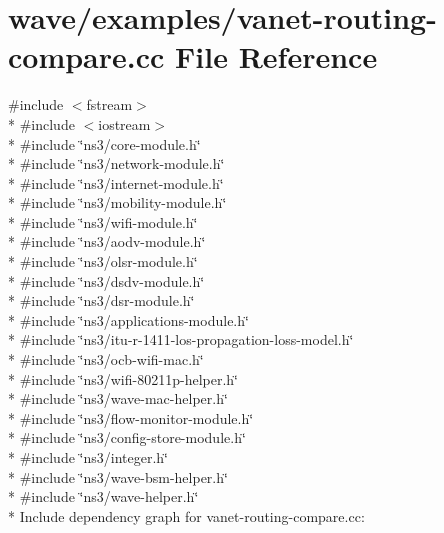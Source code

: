 \hypertarget{vanet-routing-compare_8cc}{}\section{wave/examples/vanet-\/routing-\/compare.cc File Reference}
\label{vanet-routing-compare_8cc}
{\ttfamily \#include $<$fstream$>$}\\*
{\ttfamily \#include $<$iostream$>$}\\*
{\ttfamily \#include \char`\"{}ns3/core-\/module.\+h\char`\"{}}\\*
{\ttfamily \#include \char`\"{}ns3/network-\/module.\+h\char`\"{}}\\*
{\ttfamily \#include \char`\"{}ns3/internet-\/module.\+h\char`\"{}}\\*
{\ttfamily \#include \char`\"{}ns3/mobility-\/module.\+h\char`\"{}}\\*
{\ttfamily \#include \char`\"{}ns3/wifi-\/module.\+h\char`\"{}}\\*
{\ttfamily \#include \char`\"{}ns3/aodv-\/module.\+h\char`\"{}}\\*
{\ttfamily \#include \char`\"{}ns3/olsr-\/module.\+h\char`\"{}}\\*
{\ttfamily \#include \char`\"{}ns3/dsdv-\/module.\+h\char`\"{}}\\*
{\ttfamily \#include \char`\"{}ns3/dsr-\/module.\+h\char`\"{}}\\*
{\ttfamily \#include \char`\"{}ns3/applications-\/module.\+h\char`\"{}}\\*
{\ttfamily \#include \char`\"{}ns3/itu-\/r-\/1411-\/los-\/propagation-\/loss-\/model.\+h\char`\"{}}\\*
{\ttfamily \#include \char`\"{}ns3/ocb-\/wifi-\/mac.\+h\char`\"{}}\\*
{\ttfamily \#include \char`\"{}ns3/wifi-\/80211p-\/helper.\+h\char`\"{}}\\*
{\ttfamily \#include \char`\"{}ns3/wave-\/mac-\/helper.\+h\char`\"{}}\\*
{\ttfamily \#include \char`\"{}ns3/flow-\/monitor-\/module.\+h\char`\"{}}\\*
{\ttfamily \#include \char`\"{}ns3/config-\/store-\/module.\+h\char`\"{}}\\*
{\ttfamily \#include \char`\"{}ns3/integer.\+h\char`\"{}}\\*
{\ttfamily \#include \char`\"{}ns3/wave-\/bsm-\/helper.\+h\char`\"{}}\\*
{\ttfamily \#include \char`\"{}ns3/wave-\/helper.\+h\char`\"{}}\\*
Include dependency graph for vanet-\/routing-\/compare.cc\+:
